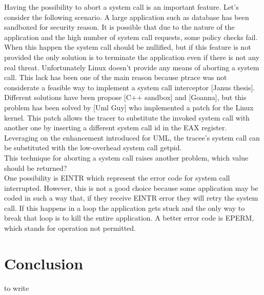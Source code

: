 Having the possibility to abort a system call is an important feature. Let’s consider the following scenario. A large application such as database has been sandboxed for security reason. It is possible that due to the nature of the application and the high number of system call requests, some policy checks fail. When this happen the system call should be nullified, but if this feature is not provided the only solution is to terminate the application even if there is not any real threat.
Unfortunately Linux doesn't provide any means of aborting a system call.  This lack has been one of the main reason because ptrace was not considerate a feasible way to implement a system call interceptor [Janus thesis]. 
Different solutions have been propose [C++ sandbox] and [Goanna], but this problem has been solved by [Uml Guy] who implemented a patch for the Linux kernel. This patch allows the tracer to substitute the invoked system call with another one by inserting a different system call id in the EAX register. Leveraging on the enhancement introduced for UML, the tracee’s system call can be substituted with the low-overhead system call getpid.\\
This technique for aborting a system call raises another problem, which value should be returned? \\
One possibility is EINTR which represent the error code for system call interrupted. However, this is not a good choice because some application may be coded in such a way that, if they receive EINTR error they will retry the system call. If this happens in a loop the application gets stuck and the only way to break that loop is to kill the entire application. A better error code is EPERM, which stands for operation not permitted.\\

\section{Conclusion}
to write\\
		